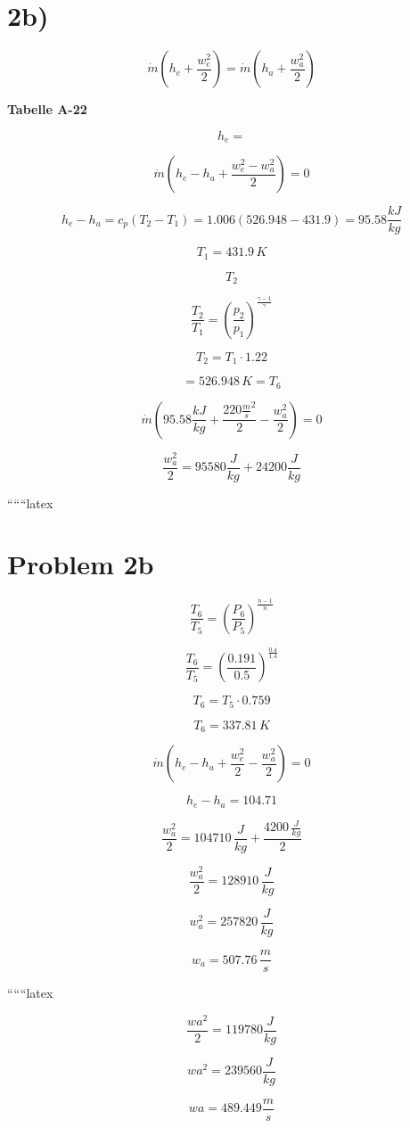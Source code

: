 

\section*{2b)}

\[
\dot{m} \left( h_e + \frac{w_e^2}{2} \right) = \dot{m} \left( h_a + \frac{w_a^2}{2} \right)
\]

\textbf{Tabelle A-22}

\[
h_e = 
\]

\[
\dot{m} \left( h_e - h_a + \frac{w_e^2 - w_a^2}{2} \right) = 0
\]

\[
h_e - h_a = c_p (T_2 - T_1) = 1.006 \left( 526.948 - 431.9 \right) = 95.58 \frac{kJ}{kg}
\]

\[
T_1 = 431.9 \, K
\]

\[
T_2
\]

\[
\frac{T_2}{T_1} = \left( \frac{p_2}{p_1} \right)^{\frac{\gamma - 1}{\gamma}}
\]

\[
T_2 = T_1 \cdot 1.22
\]

\[
= 526.948 \, K = T_6
\]

\[
\dot{m} \left( 95.58 \frac{kJ}{kg} + \frac{220 \frac{m}{s}^2}{2} - \frac{w_a^2}{2} \right) = 0
\]

\[
\frac{w_a^2}{2} = 95580 \frac{J}{kg} + 24200 \frac{J}{kg}
\]

``````latex

\section*{Problem 2b}

\[
\frac{T_6}{T_5} = \left( \frac{P_6}{P_5} \right)^{\frac{n-1}{n}}
\]

\[
\frac{T_6}{T_5} = \left( \frac{0.191}{0.5} \right)^{\frac{0.4}{1.4}}
\]

\[
T_6 = T_5 \cdot 0.759
\]

\[
T_6 = 337.81 \, K
\]

\[
\dot{m} (h_e - h_a + \frac{w_e^2}{2} - \frac{w_a^2}{2}) = 0
\]

\[
h_e - h_a = 104.71
\]

\[
\frac{w_a^2}{2} = 104710 \, \frac{J}{kg} + \frac{4200 \, \frac{J}{kg}}{2}
\]

\[
\frac{w_a^2}{2} = 128910 \, \frac{J}{kg}
\]

\[
w_a^2 = 257820 \, \frac{J}{kg}
\]

\[
w_a = 507.76 \, \frac{m}{s}
\]

``````latex


\[
\frac{w a^2}{2} = 119780 \frac{J}{kg}
\]

\[
w a^2 = 239560 \frac{J}{kg}
\]

\[
w a = 489.449 \frac{m}{s}
\]